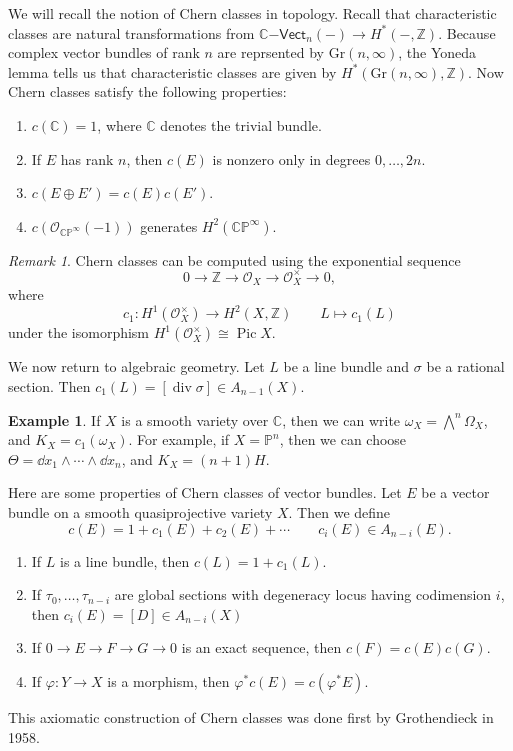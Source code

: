 \documentclass[leqno, openany]{memoir}
\theoremstyle{definition}
\newtheorem{exm}[thm]{Example}
\theoremstyle{remark}
\newtheorem{rmk}[thm]{Remark}
\theoremstyle{plain}
\theoremstyle{definition}
\theoremstyle{remark}
\newcommand{\C}{\mathbb{C}}
\newcommand{\Z}{\mathbb{Z}}
\renewcommand{\P}{\mathbb{P}}
\newcommand{\mc}[1]{\mathcal{#1}}
\newcommand{\mr}[1]{\mathrm{#1}}
\newcommand{\ms}[1]{\mathsf{#1}}
\renewcommand{\div}{\operatorname{div}}
\DeclareMathOperator{\Pic}{Pic}
\begin{document}
We will recall the notion of Chern classes in topology. Recall that
characteristic classes are natural transformations from $\C\ms{-Vect}_n(-) \to
H^*(-, \Z)$. Because complex vector bundles of rank $n$ are reprsented by
$\mr{Gr}(n, \infty)$, the Yoneda lemma tells us that characteristic classes are
given by $H^*(\mr{Gr}(n, \infty), \Z)$. Now Chern classes satisfy the following
properties: \begin{enumerate} \item $c(\C) = 1$, where $\C$ denotes the trivial
    bundle.  \item If $E$ has rank $n$, then $c(E)$ is nonzero only in degrees
    $0, \ldots, 2n$.  \item $c(E \oplus E') = c(E) c(E')$.  \item
    $c(\mc{O}_{\C\P^{\infty}}(-1))$ generates $H^2(\C\P^{\infty})$.
    \end{enumerate}

\begin{rmk} Chern classes can be computed using the exponential sequence \[ 0
    \to \Z \to \mc{O}_X \to \mc{O}_X^{\times} \to 0, \] where \[ c_1 \colon
H^1(\mc{O}_X^{\times}) \to H^2(X, \Z) \qquad L \mapsto c_1(L) \] under the
isomorphism $H^1(\mc{O}_X^{\times}) \cong \Pic X$.  \end{rmk}

We now return to algebraic geometry. Let $L$ be a line bundle and $\sigma$ be a
rational section. Then $c_1(L) = [\div \sigma] \in A_{n-1}(X)$.

\begin{exm} If $X$ is a smooth variety over $\C$, then we can write $\omega_X =
    \bigwedge^n \Omega_X$, and $K_X = c_1(\omega_X)$. For example, if $X =
    \P^n$, then we can choose $\Theta = \dd{x_1} \wedge \cdots \wedge
    \dd{x_n}$, and $K_X = (n+1)H$.  \end{exm}

Here are some properties of Chern classes of vector bundles. Let $E$ be a
vector bundle on a smooth quasiprojective variety $X$. Then we define \[ c(E) =
    1 + c_1(E) + c_2(E) + \cdots \qquad c_i(E) \in A_{n-i}(E). \]
    \begin{enumerate} \item If $L$ is a line bundle, then $c(L) = 1 + c_1(L)$.
        \item If $\tau_0, \ldots, \tau_{n-i}$ are global sections with
            degeneracy locus having codimension $i$, then $c_i(E) = [D] \in
            A_{n-i}(X)$ \item If $0 \to E \to F \to G \to 0$ is an exact
            sequence, then $c(F) = c(E) c(G)$.  \item If $\varphi \colon Y \to
    X$ is a morphism, then $\varphi^* c(E) = c(\varphi^* E)$.  \end{enumerate}
    This axiomatic construction of Chern classes was done first by Grothendieck
    in 1958.
\end{document}
